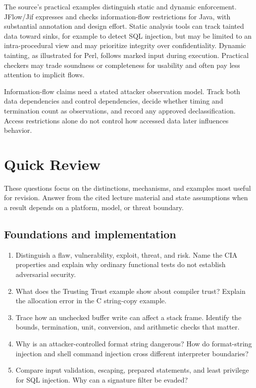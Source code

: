 \documentclass[11pt,a4paper]{article}
\newcommand{\currentmodule}{Contents}
\newcommand{\module}[2]{\par\Needspace{8\baselineskip}\gdef\currentmodule{#1}\section{#1}\label{#2}}
\numberwithin{figure}{section}
\begin{document}
The source's practical examples distinguish static and dynamic enforcement. JFlow/Jif expresses and checks information-flow restrictions for Java, with substantial annotation and design effort. Static analysis tools can track tainted data toward sinks, for example to detect SQL injection, but may be limited to an intra-procedural view and may prioritize integrity over confidentiality. Dynamic tainting, as illustrated for Perl, follows marked input during execution. Practical checkers may trade soundness or completeness for usability and often pay less attention to implicit flows.

\begin{takeaway}
Information-flow claims need a stated attacker observation model. Track both data dependencies and control dependencies, decide whether timing and termination count as observations, and record any approved declassification. Access restrictions alone do not control how accessed data later influences behavior.
\end{takeaway}

\module{Quick Review}{sec:review}
These questions focus on the distinctions, mechanisms, and examples most useful for revision. Answer from the cited lecture material and state assumptions when a result depends on a platform, model, or threat boundary.

\subsection{Foundations and implementation}
\begin{enumerate}
\item Distinguish a flaw, vulnerability, exploit, threat, and risk. Name the CIA properties and explain why ordinary functional tests do not establish adversarial security.
\item What does the Trusting Trust example show about compiler trust? Explain the allocation error in the C string-copy example.
\item Trace how an unchecked buffer write can affect a stack frame. Identify the bounds, termination, unit, conversion, and arithmetic checks that matter.
\item Why is an attacker-controlled format string dangerous? How do format-string injection and shell command injection cross different interpreter boundaries?
\item Compare input validation, escaping, prepared statements, and least privilege for SQL injection. Why can a signature filter be evaded?
\end{enumerate}
\end{document}
